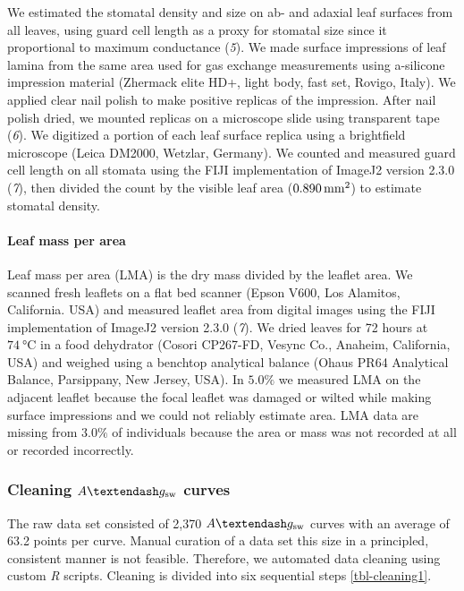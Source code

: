 \documentclass[
  letterpaper,
  DIV=11,
  numbers=noendperiod]{scrartcl}
\let\oldparagraph\paragraph
\renewcommand{\paragraph}[1]{\oldparagraph{#1}\mbox{}}
\newcommand{\agcurve}{$A \textendash g_\text{sw}$}
\begin{document}
We estimated the stomatal density and size on ab- and adaxial leaf
surfaces from all leaves, using guard cell length as a proxy for
stomatal size since it proportional to maximum conductance (\emph{5}).
We made surface impressions of leaf lamina from the same area used for
gas exchange measurements using a-silicone impression material (Zhermack
elite HD+, light body, fast set, Rovigo, Italy). We applied clear nail
polish to make positive replicas of the impression. After nail polish
dried, we mounted replicas on a microscope slide using transparent tape
(\emph{6}). We digitized a portion of each leaf surface replica using a
brightfield microscope (Leica DM2000, Wetzlar, Germany). We counted and
measured guard cell length on all stomata using the FIJI implementation
of ImageJ2 version 2.3.0 (\emph{7}), then divided the count by the
visible leaf area (\(\qty{0.890}{\raiseto{2}\milli\meter}\)) to estimate
stomatal density.

\paragraph{Leaf mass per area}\label{leaf-mass-per-area}

Leaf mass per area (LMA) is the dry mass divided by the leaflet area. We
scanned fresh leaflets on a flat bed scanner (Epson V600, Los Alamitos,
California. USA) and measured leaflet area from digital images using the
FIJI implementation of ImageJ2 version 2.3.0 (\emph{7}). We dried leaves
for 72 hours at \(\qty{74}{\degreeCelsius}\) in a food dehydrator
(Cosori CP267-FD, Vesync Co., Anaheim, California, USA) and weighed
using a benchtop analytical balance (Ohaus PR64 Analytical Balance,
Parsippany, New Jersey, USA). In \(5.0\%\) we measured LMA on the
adjacent leaflet because the focal leaflet was damaged or wilted while
making surface impressions and we could not reliably estimate area. LMA
data are missing from \(3.0\%\) of individuals because the area or mass
was not recorded at all or recorded incorrectly.

\subsubsection{\texorpdfstring{Cleaning \agcurve{}
curves}{Cleaning  curves}}\label{cleaning-curves}

The raw data set consisted of 2,370 \agcurve{} curves with an average of
63.2 points per curve. Manual curation of a data set this size in a
principled, consistent manner is not feasible. Therefore, we automated
data cleaning using custom \emph{R} scripts. Cleaning is divided into
six sequential steps \autoref{tbl-cleaning1}.
\end{document}
